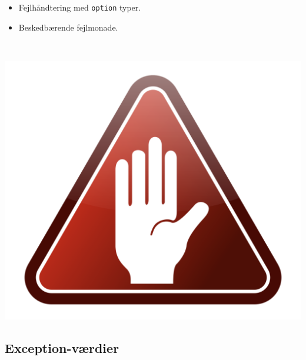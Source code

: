 \documentclass[rgb]{beamer}
\begin{document}
\begin{frame}[fragile]
\begin{footnotesize}
\begin{minipage}{.65\textwidth}
\begin{enumerate}
    \begin{itemize}
    \item Fejlhåndtering med \lstinline{option} typer.
    \item Beskedbærende fejlmonade.
    \end{itemize}
  \end{enumerate}
  \end{minipage}~\begin{minipage}{.3\textwidth}
  \includegraphics[width=1.2\textwidth]{../images/exception.png}
  \end{minipage}

\end{footnotesize}
\end{frame}
\subsection{Exception-værdier}
\end{document}
